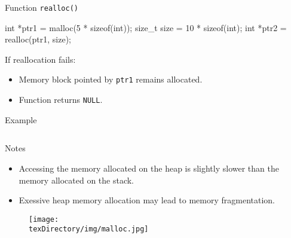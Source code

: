 \documentclass[compress]{beamer}
\begin{document}
\begin{slide}
	\begin{block}{Function \texttt{realloc()}}

	\begin{terminal}
	int *ptr1 = malloc(5 * sizeof(int));
	size_t size = 10 * sizeof(int);
	int *ptr2 = realloc(ptr1, size);
	\end{terminal}

	If reallocation fails:
	\begin{itemize}
	\item[] Memory block pointed by \texttt{ptr1} remains allocated.
	\item[] Function returns \texttt{NULL}.
	\end{itemize}

	\end{block}
\end{slide}

\begin{slide}
	\begin{block}{Example}

	\inputminted[fontsize=\scriptsize, firstline=10, linenos]{c}{
		\resDirectory/realloc.c
	}

	\end{block}
\end{slide}

\begin{slide}
	\begin{block}{Notes}

	\begin{itemize}
	\item[] Accessing the memory allocated on the heap is slightly slower than the memory allocated on the stack.
	\item[] Exessive heap memory allocation may lead to memory fragmentation.
	\end{itemize}

	\end{block}
\end{slide}

\begin{slide}
	\begin{figure}
	\texttt{[image: \\texDirectory/img/malloc.jpg]}
	\end{figure}
\end{slide}
\end{document}
